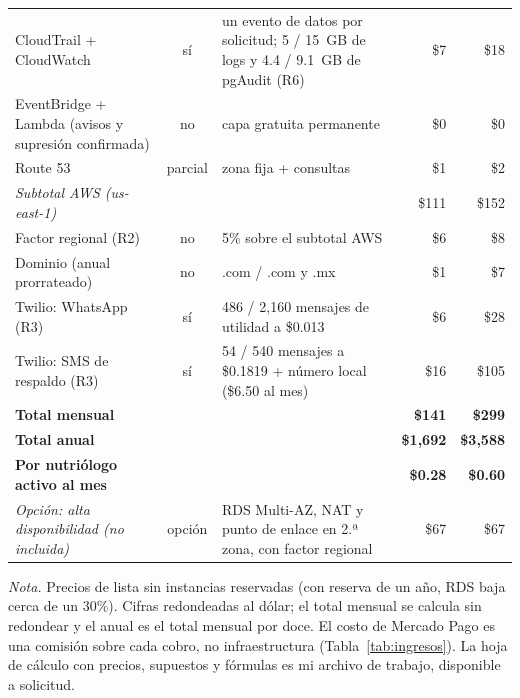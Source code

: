 \documentclass[12pt, a4paper]{article}
\begin{document}
\begin{table}[!ht]
\begin{tabularx}{\textwidth}{p{3.4cm} c X r r}
    CloudTrail + CloudWatch & sí & un evento de datos por solicitud; 5 / 15~GB de logs y 4.4 / 9.1~GB de pgAudit (R6) & \$7 & \$18 \\
    EventBridge + Lambda (avisos y supresión confirmada) & no & capa gratuita permanente & \$0 & \$0 \\
    Route 53 & parcial & zona fija + consultas & \$1 & \$2 \\
    \midrule
    \textit{Subtotal AWS (us-east-1)} & & & \$111 & \$152 \\
    Factor regional (R2) & no & 5\% sobre el subtotal AWS & \$6 & \$8 \\
    Dominio (anual prorrateado) & no & .com / .com y .mx & \$1 & \$7 \\
    Twilio: WhatsApp (R3) & sí & 486 / 2,160 mensajes de utilidad a \$0.013 & \$6 & \$28 \\
    Twilio: SMS de respaldo (R3) & sí & 54 / 540 mensajes a \$0.1819 + número local (\$6.50 al mes) & \$16 & \$105 \\
    \midrule
    \textbf{Total mensual} & & & \textbf{\$141} & \textbf{\$299} \\
    \textbf{Total anual} & & & \textbf{\$1,692} & \textbf{\$3,588} \\
    \textbf{Por nutriólogo activo al mes} & & & \textbf{\$0.28} & \textbf{\$0.60} \\
    \midrule
    \textit{Opción: alta disponibilidad (no incluida)} & opción & RDS Multi-AZ, NAT y punto de enlace en 2.ª zona, con factor regional & \$67 & \$67 \\
    \bottomrule
  \end{tabularx}
  \begin{flushleft}
    \footnotesize\textit{Nota.} Precios de lista sin instancias reservadas (con
    reserva de un año, RDS baja cerca de un 30\%). Cifras redondeadas al
    dólar; el total mensual se calcula sin redondear y el anual es el
    total mensual por doce. El costo de Mercado Pago es una comisión sobre cada cobro, no infraestructura (Tabla~\ref{tab:ingresos}).
    La hoja de cálculo con precios, supuestos y
    fórmulas es mi archivo de trabajo, disponible a solicitud.
  \end{flushleft}
\end{table}
 
\end{document}
